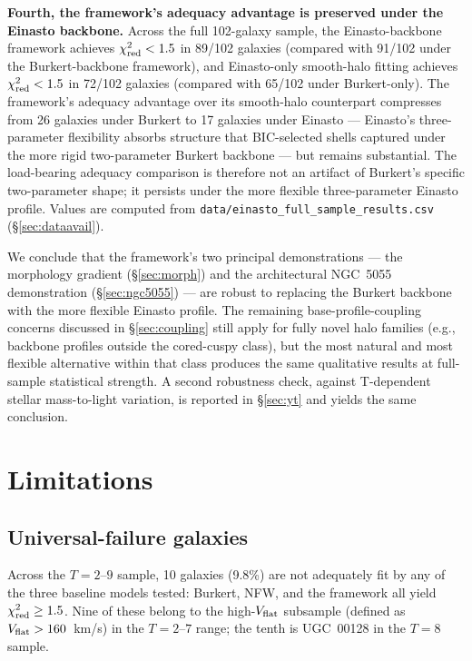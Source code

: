 \documentclass[linenumbers]{aastex701}
\newcommand{\Vflat}{V_{\rm flat}}
\newcommand{\chired}{\chi^2_{\rm red}}
\begin{document}
\textbf{Fourth, the framework's adequacy advantage is preserved under the Einasto backbone.} Across the full 102-galaxy sample, the Einasto-backbone framework achieves $\chired < 1.5$ in 89/102 galaxies (compared with 91/102 under the Burkert-backbone framework), and Einasto-only smooth-halo fitting achieves $\chired < 1.5$ in 72/102 galaxies (compared with 65/102 under Burkert-only). The framework's adequacy advantage over its smooth-halo counterpart compresses from 26 galaxies under Burkert to 17 galaxies under Einasto --- Einasto's three-parameter flexibility absorbs structure that BIC-selected shells captured under the more rigid two-parameter Burkert backbone --- but remains substantial. The load-bearing adequacy comparison is therefore not an artifact of Burkert's specific two-parameter shape; it persists under the more flexible three-parameter Einasto profile. Values are computed from \texttt{data/einasto\_full\_sample\_results.csv} (\S\ref{sec:dataavail}).

We conclude that the framework's two principal demonstrations --- the morphology gradient (\S\ref{sec:morph}) and the architectural NGC~5055 demonstration (\S\ref{sec:ngc5055}) --- are robust to replacing the Burkert backbone with the more flexible Einasto profile. The remaining base-profile-coupling concerns discussed in \S\ref{sec:coupling} still apply for fully novel halo families (e.g., backbone profiles outside the cored-cuspy class), but the most natural and most flexible alternative within that class produces the same qualitative results at full-sample statistical strength. A second robustness check, against T-dependent stellar mass-to-light variation, is reported in \S\ref{sec:yt} and yields the same conclusion.


\section{Limitations}\label{sec:limitations}

\subsection{Universal-failure galaxies}\label{sec:universal}

Across the $T=2$--$9$ sample, 10 galaxies (9.8\%) are not adequately fit by any of the three baseline models tested: Burkert, NFW, and the framework all yield $\chired \ge 1.5$. Nine of these belong to the high-$\Vflat$ subsample (defined as $\Vflat > 160$~km/s) in the $T=2$--$7$ range; the tenth is UGC~00128 in the $T=8$ sample.
\end{document}
